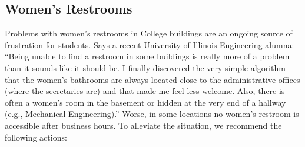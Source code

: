 \newpage


\subsection{Women's Restrooms}

Problems with women's restrooms in College buildings are an ongoing
source of frustration for students.
Says a recent University of Illinois Engineering alumna: 
``Being unable to find a restroom
in some buildings is really more of a problem than it sounds like it 
should be.  I finally discovered the very simple algorithm that the women's
bathrooms are always located close to the administrative offices (where the
secretaries are) and that made me feel less welcome.  Also, there is often
a women's room in the basement or hidden at the very end of a hallway 
(e.g., Mechanical Engineering).''
Worse, in some locations no women's restroom is accessible after business
hours.
To alleviate the situation, we recommend the following actions:

